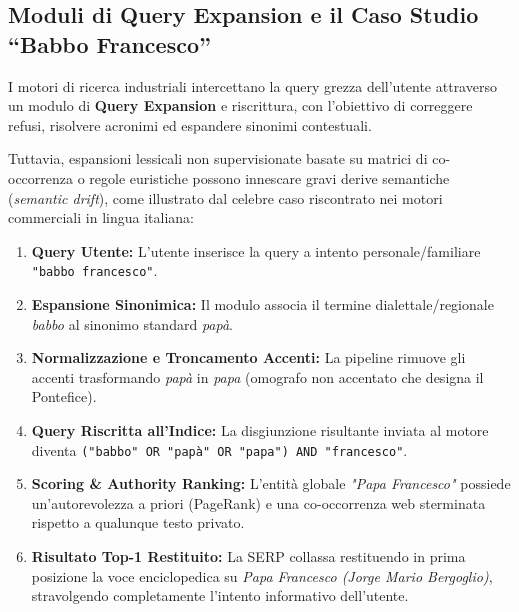 \subsection{Moduli di Query Expansion e il Caso Studio ``Babbo Francesco''}
I motori di ricerca industriali intercettano la query grezza dell'utente attraverso un modulo di \textbf{Query Expansion} e riscrittura, con l'obiettivo di correggere refusi, risolvere acronimi ed espandere sinonimi contestuali. 

Tuttavia, espansioni lessicali non supervisionate basate su matrici di co-occorrenza o regole euristiche possono innescare gravi derive semantiche (\textit{semantic drift}), come illustrato dal celebre caso riscontrato nei motori commerciali in lingua italiana:
\begin{enumerate}
    \item \textbf{Query Utente:} L'utente inserisce la query a intento personale/familiare \texttt{"babbo francesco"}.
    \item \textbf{Espansione Sinonimica:} Il modulo associa il termine dialettale/regionale \textit{babbo} al sinonimo standard \textit{pap\`a}.
    \item \textbf{Normalizzazione e Troncamento Accenti:} La pipeline rimuove gli accenti trasformando \textit{pap\`a} in \textit{papa} (omografo non accentato che designa il Pontefice).
    \item \textbf{Query Riscritta all'Indice:} La disgiunzione risultante inviata al motore diventa \texttt{("babbo" OR "pap\`a" OR "papa") AND "francesco"}.
    \item \textbf{Scoring \& Authority Ranking:} L'entit\`a globale \textit{"Papa Francesco"} possiede un'autorevolezza a priori (PageRank) e una co-occorrenza web sterminata rispetto a qualunque testo privato.
    \item \textbf{Risultato Top-1 Restituito:} La SERP collassa restituendo in prima posizione la voce enciclopedica su \textit{Papa Francesco (Jorge Mario Bergoglio)}, stravolgendo completamente l'intento informativo dell'utente.
\end{enumerate}


